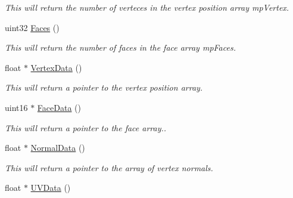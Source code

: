 \begin{DoxyCompactItemize}
\begin{DoxyCompactList}\small\item\em This will return the number of verteces in the vertex position array mpVertex. \end{DoxyCompactList}\item 
\hypertarget{classc_mesh_a5f1b578685730d581301f3b5dbb2f83c}{
uint32 \hyperlink{classc_mesh_a5f1b578685730d581301f3b5dbb2f83c}{Faces} ()}
\label{classc_mesh_a5f1b578685730d581301f3b5dbb2f83c}

\begin{DoxyCompactList}\small\item\em This will return the number of faces in the face array mpFaces. \end{DoxyCompactList}\item 
\hypertarget{classc_mesh_a56283d0c69f6b4987176c8714eb10987}{
float $\ast$ \hyperlink{classc_mesh_a56283d0c69f6b4987176c8714eb10987}{VertexData} ()}
\label{classc_mesh_a56283d0c69f6b4987176c8714eb10987}

\begin{DoxyCompactList}\small\item\em This will return a pointer to the vertex position array. \end{DoxyCompactList}\item 
\hypertarget{classc_mesh_a2d82a22947dbeaaa53309f3641e8c371}{
uint16 $\ast$ \hyperlink{classc_mesh_a2d82a22947dbeaaa53309f3641e8c371}{FaceData} ()}
\label{classc_mesh_a2d82a22947dbeaaa53309f3641e8c371}

\begin{DoxyCompactList}\small\item\em This will return a pointer to the face array.. \end{DoxyCompactList}\item 
\hypertarget{classc_mesh_a534e2fc01c1ed2319d067cdb2df0c439}{
float $\ast$ \hyperlink{classc_mesh_a534e2fc01c1ed2319d067cdb2df0c439}{NormalData} ()}
\label{classc_mesh_a534e2fc01c1ed2319d067cdb2df0c439}

\begin{DoxyCompactList}\small\item\em This will return a pointer to the array of vertex normals. \end{DoxyCompactList}\item 
\hypertarget{classc_mesh_a98e9d13a984398ecbe18300d435d01d8}{
float $\ast$ \hyperlink{classc_mesh_a98e9d13a984398ecbe18300d435d01d8}{UVData} ()}
\label{classc_mesh_a98e9d13a984398ecbe18300d435d01d8}


\end{DoxyCompactItemize}
